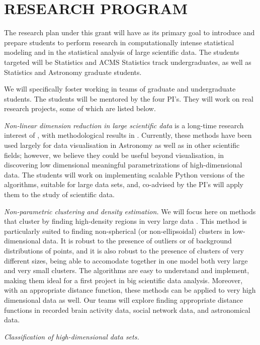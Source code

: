\section{RESEARCH PROGRAM}
\label{sec:research}

The research plan under this grant will have as its primary goal to
introduce and prepare students to perform research in computationally
intense statistical modeling and in the statistical analysis of large
scientific data. The students targeted will be Statistics and ACMS
Statistics track undergraduates, as well as Statistics and Astronomy
graduate students. 

We will specifically foster working in teams of graduate and
undergraduate students. The students will be mentored by the four
PI's. They will work on real research projects, some of which
are listed below. 
\bits
\item {\em Non-linear dimension reduction in large scientific data} is a long-time research interest of \meila, with methodological results in \cite{PerraultM:asymptotic-nips11,Perrault-JoncasM:riemann-jmlr11}. Currently, these methods have been used largely for data visualisation in Astronomy as well as in other scientific fields; however, we believe they could be useful beyond visualisation, in discovering low dimensional meaningful parametrizations of high-dimensional data. The students will work on implementing scalable Python versions of the algorithms, suitable for large data sets, and, co-advised by the PI's will apply them to the study of scientific data.
\item {\em Non-parametric clustering and density estimation.} We will
  focus here on methods that cluster by finding high-density regions
  in very large data \cite{cheng:95,nugent:10,rinaldo:13}. This method
  is particularly suited to finding non-spherical (or non-ellipsoidal)
  clusters in low-dimensional data. It is robust to the presence of
  outliers or of background distributions of points, and it is also
  robust to the presence of clusters of very different sizes, being
  able to accomodate together in one model both very large and very
  small clusters. The algorithms are easy to understand and implement,
  making them ideal for a first project in big scientific data
  analysis. Moreover, with an appropriate distance function, these
  methods can be applied to very high dimensional data as well. Our
  teams will explore finding appropriate distance functions in
  recorded brain activity data, social network data, and astronomical
  data.
\item {\em Classification of high-dimensional data sets.} 
